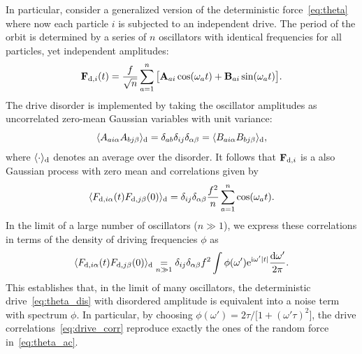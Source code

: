 \documentclass[superscriptaddress, twocolumn, prx, longbibliography, nofootinbib]{revtex4-1}
\newcommand{\dd}{\text{d}}
\newcommand{\ee}{\text{e}}
\newcommand{\ii}{\text{i}}
\begin{document}


In particular, consider a generalized version of the deterministic force~\eqref{eq:theta} where now each particle $i$ is subjected to an independent drive. The period of the orbit is determined by a series of $n$ oscillators with identical frequencies for all particles, yet independent amplitudes:
\begin{equation}\label{eq:theta_dis}
	{\bf F}_{{\rm d}, i}(t) = \frac{f}{\sqrt{n}} \sum_{a=1}^n \big[ {\bf A}_{ai} \cos(\omega_a t) + {\bf B}_{ai} \sin(\omega_a t) \big] .
\end{equation}
The drive disorder is implemented by taking the oscillator amplitudes as uncorrelated zero-mean Gaussian variables with unit variance:
\begin{equation}
	\langle A_{ai\alpha}A_{bj\beta}\rangle_{\rm d} = \delta_{ab}\delta_{ij}\delta_{\alpha\beta} = \langle B_{ai\alpha}B_{bj\beta}\rangle_{\rm d} ,
\end{equation}
where $\langle\cdot\rangle_{\rm d}$ denotes an average over the disorder. It follows that ${\bf F}_{{\rm d},i}$ is a also Gaussian process with zero mean and correlations given by
\begin{equation}
	\langle F_{{\rm d},i\alpha} (t) F_{{\rm d},j\beta}(0) \rangle_{\rm d} = \delta_{ij} \delta_{\alpha\beta} \frac{f^2}{n} \sum_{a=1}^n \cos (\omega_a t) .
\end{equation}
In the limit of a large number of oscillators ($n\gg1$), we express these correlations in terms of the density of driving frequencies $\phi$ as
\begin{equation}\label{eq:drive_corr}
	\langle F_{{\rm d},i\alpha} (t) F_{{\rm d},j\beta}(0) \rangle_\text{d} \underset{n\gg1}{=} \delta_{ij} \delta_{\alpha\beta} f^2 \int \phi(\omega') \ee^{\ii\omega'|t|} \frac{\dd\omega'}{2\pi} .
\end{equation}
This establishes that, in the limit of many oscillators, the deterministic drive~\eqref{eq:theta_dis} with disordered amplitude is equivalent into a noise term with spectrum $\phi$. In particular, by choosing $\phi(\omega') = 2\tau/ \big[1+(\omega'\tau)^2\big]$, the drive correlations~\eqref{eq:drive_corr} reproduce exactly the ones of the random force in~\eqref{eq:theta_ac}.
\end{document}
